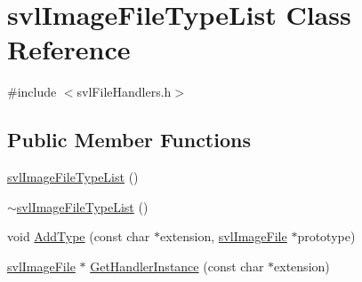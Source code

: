 \hypertarget{classsvl_image_file_type_list}{\section{svl\-Image\-File\-Type\-List Class Reference}
\label{classsvl_image_file_type_list}
}


{\ttfamily \#include $<$svl\-File\-Handlers.\-h$>$}

\subsection*{Public Member Functions}
\begin{DoxyCompactItemize}
\item 
\hyperlink{classsvl_image_file_type_list_a76bfd3b3fe9c743ff400a74d76dd75ed}{svl\-Image\-File\-Type\-List} ()
\item 
\hyperlink{classsvl_image_file_type_list_a48427784bccb132c1c58f75de42da358}{$\sim$svl\-Image\-File\-Type\-List} ()
\item 
void \hyperlink{classsvl_image_file_type_list_abe75d5d38c62f74e21aa6a6abee8f103}{Add\-Type} (const char $\ast$extension, \hyperlink{classsvl_image_file}{svl\-Image\-File} $\ast$prototype)
\item 
\hyperlink{classsvl_image_file}{svl\-Image\-File} $\ast$ \hyperlink{classsvl_image_file_type_list_a655c5510493ce2dccf82198b64387eb5}{Get\-Handler\-Instance} (const char $\ast$extension)
\end{DoxyCompactItemize}


